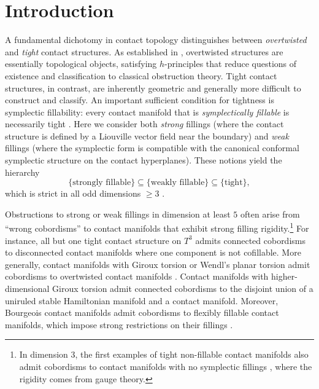 \documentclass[11pt]{amsart}
\numberwithin{equation}{section}
\begin{document}
\section{Introduction}
A fundamental dichotomy in contact topology distinguishes between \emph{overtwisted} and \emph{tight} contact structures. As established in \cite{Eli89,BEM}, overtwisted structures are essentially topological objects, satisfying $h$-principles that reduce questions of existence and classification to classical obstruction theory. Tight contact structures, in contrast, are inherently geometric and generally more difficult to construct and classify. An important sufficient condition for tightness is symplectic fillability: every contact manifold that is \emph{symplectically fillable} is necessarily tight \cite{Gro85,Eli90,Nie06,MNW,BEM,schmaltz2023nonfillability}. Here we consider both \emph{strong} fillings (where the contact structure is defined by a Liouville vector field near the boundary) and \emph{weak} fillings (where the symplectic form is compatible with the canonical conformal symplectic structure on the contact hyperplanes). These notions yield the hierarchy
\[
\{\text{strongly fillable}\}
\subseteq \{\text{weakly fillable}\} \subseteq \{\text{tight}\},
\]
which is strict in all odd dimensions $\ge 3$ \cite{Eli96,EtnHon,MNW,BGM}.

Obstructions to strong or weak fillings in dimension at least $5$ often arise from ``wrong cobordisms'' to contact manifolds that exhibit strong filling rigidity.\footnote{In dimension $3$, the first examples of tight non-fillable contact manifolds \cite{EtnHon} also admit cobordisms to contact manifolds with no symplectic fillings \cite{Lisca}, where the rigidity comes from gauge theory.} For instance,  all but one tight contact structure on $T^3$ \cite{Eli96} admits connected cobordisms to disconnected contact manifolds where one component is not cofillable. More generally, contact manifolds with Giroux torsion \cite{zbMATH00721020} or Wendl's planar torsion \cite{zbMATH06218377} admit cobordisms to overtwisted contact manifolds \cite{Gay,Wen13}. Contact manifolds with higher-dimensional Giroux torsion \cite{MNW} admit connected cobordisms to the disjoint union of a uniruled stable Hamiltonian manifold and a contact manifold. Moreover, Bourgeois contact manifolds \cite{Bourgeois02} admit cobordisms to flexibly fillable contact manifolds, which impose strong restrictions on their fillings \cite{BGZ,zbMATH07367119,zbMATH07673358,bowden2022tight}.
\end{document}
